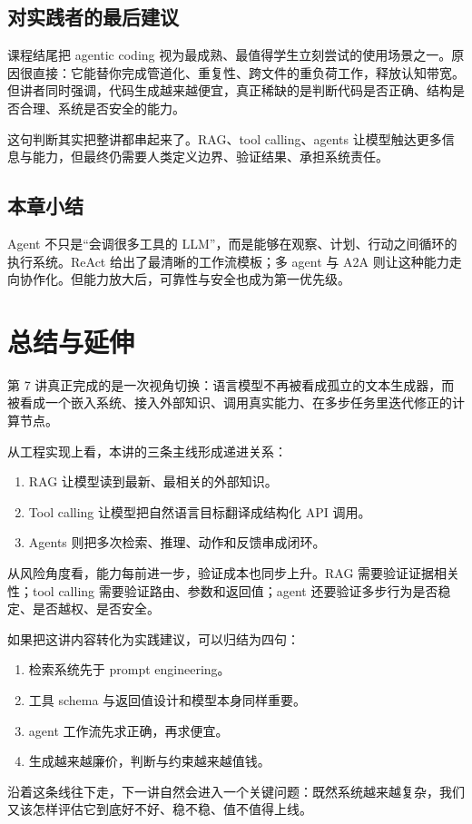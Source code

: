 \documentclass[a4paper]{article}
\begin{document}
\subsection{对实践者的最后建议}

课程结尾把 agentic coding 视为最成熟、最值得学生立刻尝试的使用场景之一。原因很直接：它能替你完成管道化、重复性、跨文件的重负荷工作，释放认知带宽。但讲者同时强调，代码生成越来越便宜，真正稀缺的是判断代码是否正确、结构是否合理、系统是否安全的能力。

这句判断其实把整讲都串起来了。RAG、tool calling、agents 让模型触达更多信息与能力，但最终仍需要人类定义边界、验证结果、承担系统责任。

\subsection{本章小结}

Agent 不只是“会调很多工具的 LLM”，而是能够在观察、计划、行动之间循环的执行系统。ReAct 给出了最清晰的工作流模板；多 agent 与 A2A 则让这种能力走向协作化。但能力放大后，可靠性与安全也成为第一优先级。

\section{总结与延伸}

第 7 讲真正完成的是一次视角切换：语言模型不再被看成孤立的文本生成器，而被看成一个嵌入系统、接入外部知识、调用真实能力、在多步任务里迭代修正的计算节点。

从工程实现上看，本讲的三条主线形成递进关系：

\begin{enumerate}
\item RAG 让模型读到最新、最相关的外部知识。
\item Tool calling 让模型把自然语言目标翻译成结构化 API 调用。
\item Agents 则把多次检索、推理、动作和反馈串成闭环。
\end{enumerate}

从风险角度看，能力每前进一步，验证成本也同步上升。RAG 需要验证证据相关性；tool calling 需要验证路由、参数和返回值；agent 还要验证多步行为是否稳定、是否越权、是否安全。

如果把这讲内容转化为实践建议，可以归结为四句：

\begin{enumerate}
\item 检索系统先于 prompt engineering。
\item 工具 schema 与返回值设计和模型本身同样重要。
\item agent 工作流先求正确，再求便宜。
\item 生成越来越廉价，判断与约束越来越值钱。
\end{enumerate}

沿着这条线往下走，下一讲自然会进入一个关键问题：既然系统越来越复杂，我们又该怎样评估它到底好不好、稳不稳、值不值得上线。
\end{document}
